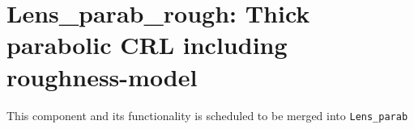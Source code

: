 \section{Lens\_parab\_rough: Thick parabolic CRL including roughness-model}

This component and its functionality is scheduled to be merged into \texttt{Lens\_parab}

